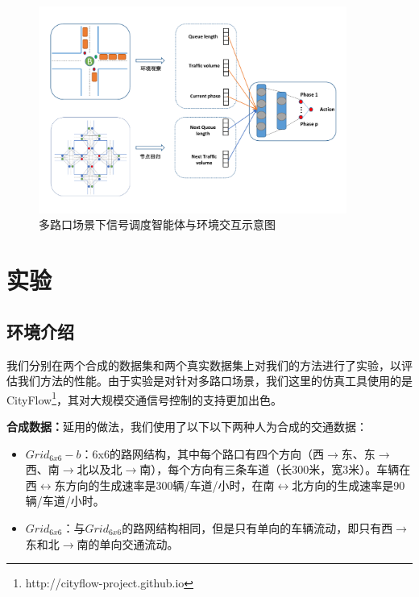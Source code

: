 \begin{figure}[htb]
  \includegraphics[width=0.9\textwidth]{fig/model-framework.pdf}
  \caption{多路口场景下信号调度智能体与环境交互示意图}
  \label{fig:model-framework}
\end{figure}

\section{实验}
\subsection{环境介绍}
我们分别在两个合成的数据集和两个真实数据集上对我们的方法进行了实验，以评估我们方法的性能。由于实验是对针对多路口场景，我们这里的仿真工具使用的是CityFlow\footnote{http://cityflow-project.github.io}，其对大规模交通信号控制的支持更加出色。

\textbf{合成数据：}延用的做法，我们使用了以下以下两种人为合成的交通数据：

\begin{itemize}
  \item $Grid_{6x6}-b$：6x6的路网结构，其中每个路口有四个方向（西$\rightarrow$东、东$\rightarrow$西、南$\rightarrow$北以及北$\rightarrow$南），每个方向有三条车道（长300米，宽3米）。车辆在西$\leftrightarrow$东方向的生成速率是300辆/车道/小时，在南$\leftrightarrow$北方向的生成速率是90辆/车道/小时。
  \item $Grid_{6x6}$：与$Grid_{6x6}$的路网结构相同，但是只有单向的车辆流动，即只有西$\rightarrow$东和北$\rightarrow$南的单向交通流动。
\end{itemize}

